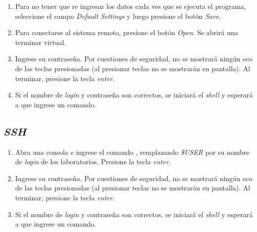 \documentclass[12pt]{article}
\begin{document}
\begin{enumerate}
    \item Para no tener que re ingresar los datos cada ves que se ejecuta el
        programa, seleccione el campo \emph{Default Settings} y luego presione
        el botón \emph{Save}.

    \item Para conectarse al sistema remoto, presione el botón \emph{Open}. Se
        abrirá una terminar virtual.

    \item Ingrese su contraseña. Por cuestiones de seguridad, no se mostrará
        ningún eco de las teclas presionadas (al presionar teclas no se
        mostrarán en pantalla). Al terminar, presione la tecla 
        \emph{enter}.

    \item Si el nombre de \emph{login} y contraseña son correctos, se iniciará
        el \emph{shell} y esperará a que ingrese un comando.

\end{enumerate}

\subsection*{\emph{SSH}}

\begin{enumerate}

    \item Abra una consola e ingrese el comando , remplazando \emph{\$USER}
        por su nombre de \emph{login} de los laboratorios.  Presione la tecla
        \emph{enter}.

    \item Ingrese su contraseña. Por cuestiones de seguridad, no se mostrará
        ningún eco de las teclas presionadas (al presionar teclas no se
        mostrarán en pantalla). Al terminar, presione la tecla 
        \emph{enter}.

    \item Si el nombre de \emph{login} y contraseña son correctos, se iniciará
        el \emph{shell} y esperará a que ingrese un comando.

\end{enumerate}
\end{document}
